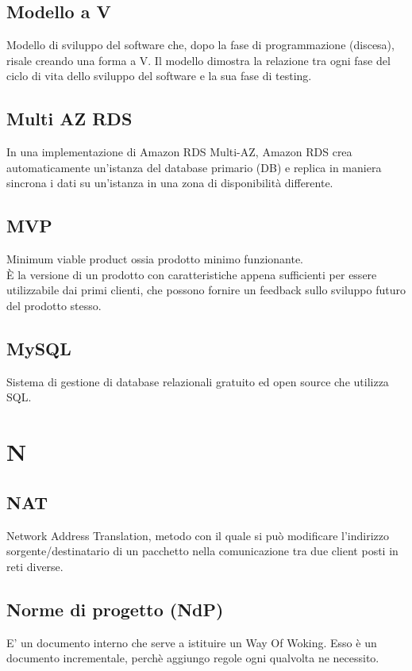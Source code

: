 \documentclass{classes/base}
\begin{document}
        \subsection*{Modello a V}
        Modello di sviluppo del software che, dopo la fase di programmazione (discesa), risale creando una forma a V. Il modello dimostra la relazione tra ogni fase del ciclo di vita dello sviluppo del software e la sua fase di testing.

        \subsection*{Multi AZ RDS} 
        In una implementazione di Amazon RDS Multi-AZ, Amazon RDS crea automaticamente un’istanza del database primario (DB) e replica in maniera sincrona i dati su un’istanza in una zona di disponibilità differente.

        \subsection*{MVP}
        Minimum viable product ossia prodotto minimo funzionante. \\
        È la versione di un prodotto con caratteristiche appena sufficienti per essere utilizzabile dai primi clienti, che possono fornire un feedback sullo sviluppo futuro del prodotto stesso.

        \subsection*{MySQL}
        Sistema di gestione di database relazionali gratuito ed open source che utilizza SQL.
        \newpage  
    \section{N}
        \subsection*{NAT}
        Network Address Translation, metodo con il quale si può modificare l'indirizzo sorgente/destinatario di un pacchetto nella comunicazione tra due client posti in reti diverse.

        \subsection*{Norme di progetto (NdP)} 
        E' un documento interno che serve a istituire un Way Of Woking. Esso è un documento incrementale, perchè aggiungo regole ogni qualvolta ne necessito.
        
\end{document}
